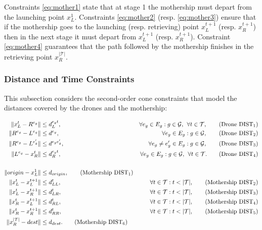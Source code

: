 \documentclass[10pt,a4paper]{elsarticle}
\newcommand{\EN}[1]{{\color{black}#1}}
\begin{document}
\noindent
Constraints \eqref{eq:mother1} state that at stage 1 the mothership must depart from the launching point $x_L^1$. Constraints \eqref{eq:mother2} (resp. \eqref{eq:mother3}) ensure that if the mothership go\EN{es} to the launching (resp. retrieving) point $x_L^{t+1}$ (resp. $x_R^{t+1}$) then in the next stage it must depart from $x_L^{t+1}$ (resp. $x_R^{t+1}$). Constraint \eqref{eq:mother4} guarantee\EN{s} that the path followed by the mothership finishes in the retrieving point $x_R^{|\mathcal T|}$.


\subsubsection*{Distance and Time Constraints}
\noindent
This subsection considers the second-order cone constraints that model the distances covered by the drones and the mothership:

\begin{align*}
\|x_L^t- R^{e_g}\| & \leq  d_L^{e_gt},  &\forall e_g\in E_g:g\in \mathcal{G}, \:\:\forall t\in \mathcal T, \tag{Drone DIST$_{1}$} \label{eq:drone-d1-async}\\
\|R^{e_g}- L^{e_g}\| & \leq  d^{e_g},  &\forall e_g\in E_g:g\in \mathcal{G}, \tag{Drone DIST$_{2}$} \label{eq:drone-d2-async}\\
\|R^{e_g}- L^{e'_g}\| & \leq  d^{e_ge'_g}, &\forall e_g\neq e_g'\in E_g:g\in \mathcal{G}, \tag{Drone DIST$_{3}$} \label{eq:drone-d3-async}\\
\|L^{e_g}- x_R^t\| & \leq  d_R^{e_gt}, &\forall e_g\in E_g:g\in \mathcal{G},\:\:\forall t\in \mathcal T. \tag{Drone DIST$_{4}$} \label{eq:drone-d4-async}\\\\
\|origin - x_L^1\| & \leq d_{origin}, \tag{Mothership DIST$_1$}\label{eq:mothership-d1-async}\\
\|x_L^t - x_L^{t+1}\| & \leq d_{LL}^{t}, &\forall t\in\mathcal T:t<|\mathcal T|, \tag{Mothership DIST$_{2}$}\label{eq:mothership-d2-async}\\
\|x_L^t - x_R^{t+1}\| & \leq d_{LR}^{t}, &\forall t\in\mathcal T:t<|\mathcal T|, \tag{Mothership DIST$_{3}$}\label{eq:mothership-d3-async}\\
\|x_R^t - x_L^{t+1}\| & \leq d_{RL}^{t}, &\forall t\in\mathcal T:t<|\mathcal T|, \tag{Mothership DIST$_{4}$}\label{eq:mothership-d4-async}\\
\|x_R^t - x_R^{t+1}\| & \leq d_{RR}^{t}, &\forall t\in\mathcal T:t<|\mathcal T|, \tag{Mothership DIST$_{5}$}\label{eq:mothership-d5-async}\\
\|x_R^{|\mathcal T|} - dest\| & \leq d_{dest}. \tag{Mothership DIST$_6$}\label{eq:mothership-d6-async}
\end{align*}
\end{document}

